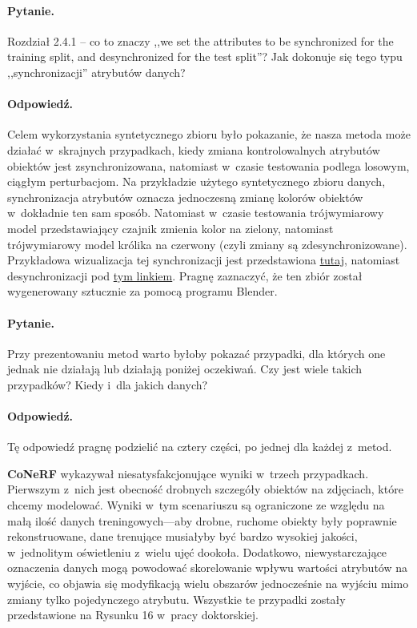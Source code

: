 \documentclass{rebuttal}
\begin{document}
  \responsedelimiter

\paragraph{Pytanie.}
  Rozdział 2.4.1 -- co to znaczy ,,we set the attributes to be synchronized for
  the training split, and desynchronized for the test split''? Jak dokonuje się
  tego typu ,,synchronizacji'' atrybutów danych?

\paragraph{Odpowiedź.}
  Celem wykorzystania syntetycznego zbioru było pokazanie, że nasza metoda może
  działać w~skrajnych przypadkach, kiedy zmiana kontrolowalnych atrybutów
  obiektów jest zsynchronizowana, natomiast w~czasie testowania podlega losowym,
  ciągłym perturbacjom. Na przykładzie użytego syntetycznego zbioru danych,
  synchronizacja atrybutów oznacza jednoczesną zmianę kolorów obiektów
  w~dokładnie ten sam sposób. Natomiast w~czasie testowania trójwymiarowy model
  przedstawiający czajnik zmienia kolor na zielony, natomiast trójwymiarowy
  model królika na czerwony (czyli zmiany są zdesynchronizowane). Przykładowa
  wizualizacja tej synchronizacji jest przedstawiona
  \href{https://conerf.github.io/videos/synthetic-data/train.mp4}{tutaj},
  natomiast desynchronizacji pod
  \href{https://conerf.github.io/videos/synthetic-data/valid.mp4}{tym linkiem}.
  Pragnę zaznaczyć, że ten zbiór został wygenerowany sztucznie za pomocą
  programu Blender.

  \responsedelimiter

\paragraph{Pytanie.}
  Przy prezentowaniu metod warto byłoby pokazać przypadki, dla których one
  jednak nie działają lub działają poniżej oczekiwań. Czy jest wiele takich
  przypadków? Kiedy i~dla jakich danych?
\paragraph{Odpowiedź.}
  Tę odpowiedź pragnę podzielić na cztery części, po jednej dla każdej z~metod.

  \textbf{CoNeRF} wykazywał niesatysfakcjonujące wyniki w~trzech przypadkach.
  Pierwszym z~nich jest obecność drobnych szczegóły obiektów na zdjęciach, które
  chcemy modelować. Wyniki w~tym scenariuszu są ograniczone ze względu na małą
  ilość danych treningowych---aby drobne, ruchome obiekty były poprawnie
  rekonstruowane, dane trenujące musiałyby być bardzo wysokiej jakości,
  w~jednolitym oświetleniu z~wielu ujęć dookoła. Dodatkowo, niewystarczające
  oznaczenia danych mogą powodować skorelowanie wpływu wartości atrybutów na
  wyjście, co objawia się modyfikacją wielu obszarów jednocześnie na wyjściu
  mimo zmiany tylko pojedynczego atrybutu. Wszystkie te przypadki zostały
  przedstawione na Rysunku 16 w~pracy doktorskiej.
\end{document}
